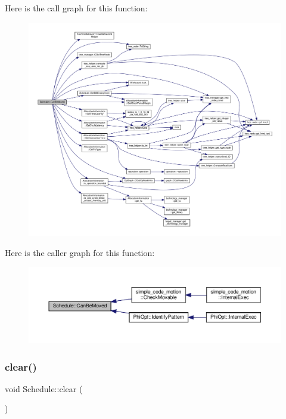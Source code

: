 Here is the call graph for this function\+:
\nopagebreak
\begin{figure}[H]
\begin{center}
\leavevmode
\includegraphics[width=350pt]{df/d61/classSchedule_aa45880695985aff9d1433a96c23cc960_cgraph}
\end{center}
\end{figure}
Here is the caller graph for this function\+:
\nopagebreak
\begin{figure}[H]
\begin{center}
\leavevmode
\includegraphics[width=350pt]{df/d61/classSchedule_aa45880695985aff9d1433a96c23cc960_icgraph}
\end{center}
\end{figure}
\mbox{\label{classSchedule_aa94b33ccedaa82177f6a78b3fe646446}} 
\subsubsection{\texorpdfstring{clear()}{clear()}}
{\footnotesize\ttfamily void Schedule\+::clear (\begin{DoxyParamCaption}{ }\end{DoxyParamCaption})}



